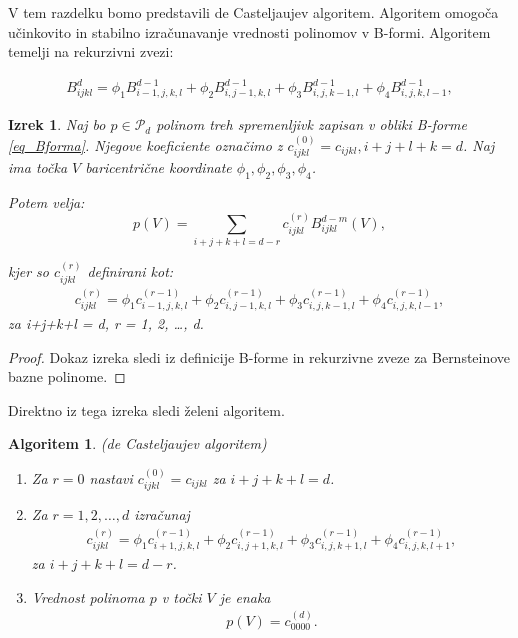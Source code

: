 \documentclass[11pt,a4paper]{article}
\newtheorem{theorem}{Izrek}
\newtheorem{algorithm}{Algoritem}
\begin{document}
V tem razdelku bomo predstavili de Casteljaujev algoritem. Algoritem omogoča učinkovito in stabilno izračunavanje vrednosti polinomov v B-formi. Algoritem temelji na rekurzivni zvezi:

\begin{align*}
 B_{ijkl}^d = \phi_1 B_{i-1,j,k,l}^{d-1} + \phi_2 B_{i,j-1,k,l}^{d-1} + \phi_3 B_{i,j,k-1,l}^{d-1} + \phi_4 B_{i,j,k,l-1}^{d-1}, 
\end{align*}

\begin{theorem}
    Naj bo $p \in \mathcal{P}_d$ polinom treh spremenljivk zapisan v obliki B-forme \eqref{eq_Bforma}. Njegove koeficiente označimo z $c_{ijkl}^{(0)} = c_{ijkl}, i+j+l+k = d$.
    Naj ima točka $V$ baricentrične koordinate $\phi_1, \phi_2, \phi_3, \phi_4$.

    Potem velja:
    $$
    p(V) = \sum_{i+j+k+l = d-r} c_{ijkl}^{(r)} B_{ijkl}^{d-m}(V),
    $$

    kjer so  $c_{ijkl}^{(r)}$ definirani kot:
    \begin{align*}
        c_{ijkl}^{(r)} = \phi_1 c_{i-1,j,k,l}^{(r-1)} + \phi_2 c_{i,j-1,k,l}^{(r-1)} + \phi_3 c_{i,j,k-1,l}^{(r-1)} + \phi_4 c_{i,j,k,l-1}^{(r-1)},
    \end{align*}
    za i+j+k+l = d, r = 1, 2, \ldots, d.
\end{theorem}

\begin{proof}
    Dokaz izreka sledi iz definicije B-forme in rekurzivne zveze za Bernsteinove bazne polinome.
\end{proof}


Direktno iz tega izreka sledi želeni algoritem.

\begin{algorithm}{(de Casteljaujev algoritem)}
    \begin{enumerate}
        \item Za $r = 0$ nastavi $c_{ijkl}^{(0)} = c_{ijkl}$ za $i+j+k+l = d$.
        \item Za $r = 1, 2, \ldots, d$ izračunaj
        \begin{align*}
            c_{ijkl}^{(r)} = \phi_1 c_{i+1,j,k,l}^{(r-1)} + \phi_2 c_{i,j+1,k,l}^{(r-1)} + \phi_3 c_{i,j,k+1,l}^{(r-1)} + \phi_4 c_{i,j,k,l+1}^{(r-1)},
        \end{align*}
        za $i+j+k+l = d-r$.
        \item Vrednost polinoma $p$ v točki $V$ je enaka
        \begin{align*}
            p(V) = c_{0000}^{(d)}.
        \end{align*}
    \end{enumerate}
\end{algorithm}
\end{document}
